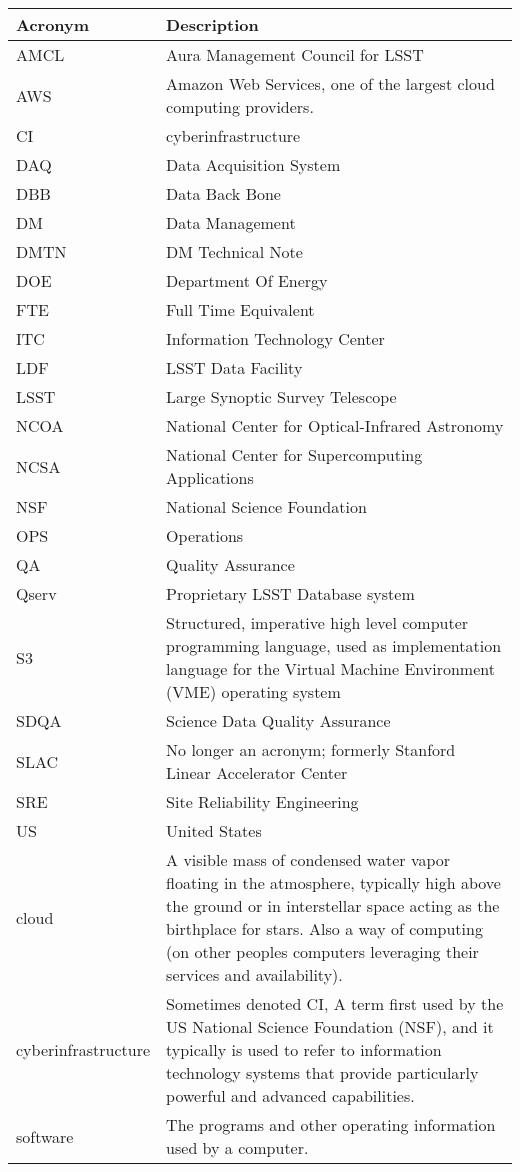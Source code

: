 \addtocounter{table}{-1}
\begin{longtable}{|l|p{}|}\hline
\textbf{Acronym} & \textbf{Description}  \\\hline

AMCL & Aura Management Council for LSST \\\hline
AWS & Amazon Web Services, one of the largest cloud computing providers. \\\hline
CI & \gls{cyberinfrastructure} \\\hline
DAQ & Data Acquisition System \\\hline
DBB & Data Back Bone \\\hline
DM & Data Management \\\hline
DMTN & DM Technical Note \\\hline
DOE & Department Of Energy \\\hline
FTE & Full Time Equivalent \\\hline
ITC & Information Technology Center \\\hline
LDF & LSST Data Facility \\\hline
LSST & Large Synoptic Survey Telescope \\\hline
NCOA & National Center for Optical-Infrared Astronomy \\\hline
NCSA & National Center for Supercomputing Applications \\\hline
NSF & National Science Foundation \\\hline
OPS & Operations \\\hline
QA & Quality Assurance \\\hline
Qserv & Proprietary LSST Database system \\\hline
S3 & Structured, imperative high level computer programming language, used as implementation language for the Virtual Machine Environment (\gls{VME}) operating system \\\hline
SDQA & Science Data Quality Assurance \\\hline
SLAC & No longer an acronym; formerly Stanford Linear Accelerator Center \\\hline
SRE & Site Reliability Engineering \\\hline
US & United States \\\hline
cloud & A visible mass of condensed water vapor floating in the atmosphere, typically high above the ground or in interstellar space acting as the birthplace for stars.  Also a way of computing (on other peoples computers leveraging their services and availability). \\\hline
cyberinfrastructure & Sometimes denoted CI, A term first used by the US National Science Foundation (\gls{NSF}), and it typically is used to refer to information technology systems that provide particularly powerful and advanced capabilities. \\\hline
software & The programs and other operating information used by a computer. \\\hline
\end{longtable}
